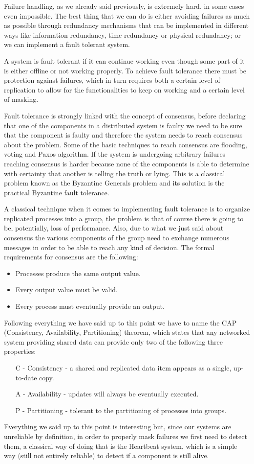 Failure handling, as we already said previously, is extremely hard, in some cases even impossible. The best thing that we can do is either avoiding failures as much as possible through redundancy mechanisms that can be implemented in different ways like information redundancy, time redundancy or physical redundancy; or we can implement a fault tolerant system.

A system is fault tolerant if it can continue working even though some part of it is either offline or not working properly. To achieve fault tolerance there must be protection against failures, which in turn requires both a certain level of replication to allow for the functionalities to keep on working and a certain level of masking.

Fault tolerance is strongly linked with the concept of consensus, before declaring that one of the components in a distributed system is faulty we need to be sure that the component is faulty and therefore the system needs to reach consensus about the problem. Some of the basic techniques to reach consensus are flooding, voting and Paxos algorithm. If the system is undergoing arbitrary failures reaching consensus is harder because none of the components is able to determine with certainty that another is telling the truth or lying. This is a classical problem known as the Byzantine Generals problem and its solution is the practical Byzantine fault tolerance.

A classical technique when it comes to implementing fault tolerance is to organize replicated processes into a group, the problem is that of course there is going to be, potentially, loss of performance. Also, due to what we just said about consensus the various components of the group need to exchange numerous messages in order to be able to reach any kind of decision. The formal requirements for consensus are the following:
\begin{itemize}
    \item Processes produce the same output value.
    \item Every output value must be valid.
    \item Every process must eventually provide an output.
\end{itemize}
Following everything we have said up to this point we have to name the CAP (Consistency, Availability, Partitioning) theorem, which states that any networked system providing shared data can provide only two of the following three properties:
\begin{itemize}
    \item[C] - Consistency - a shared and replicated data item appears as a single, up-to-date copy.
    \item[A] - Availability - updates will always be eventually executed.
    \item[P] - Partitioning - tolerant to the partitioning of processes into groups.
\end{itemize}
Everything we said up to this point is interesting but, since our systems are unreliable by definition, in order to properly mask failures we first need to detect them, a classical way of doing that is the Heartbeat system, which is a simple way (still not entirely reliable) to detect if a component is still alive.

